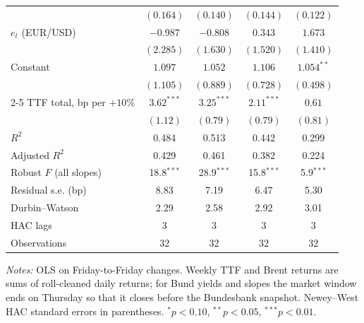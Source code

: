 \documentclass[11pt,a4paper]{article}
\begin{document}
\begin{table}[htbp]
\begin{tabular}{@{}l*{4}{c}@{}}
 & $(0.164)$ & $(0.140)$ & $(0.144)$ & $(0.122)$\\
$e_t$ (EUR/USD) & $-0.987$ & $-0.808$ & $0.343$ & $1.673$\\
 & $(2.285)$ & $(1.630)$ & $(1.520)$ & $(1.410)$\\
Constant & $1.097$ & $1.052$ & $1.106$ & $1.054^{**}$\\
 & $(1.105)$ & $(0.889)$ & $(0.728)$ & $(0.498)$\\
\cmidrule(l){2-5}
TTF total, bp per $+10\%$ & $3.62^{***}$ & $3.25^{***}$ & $2.11^{***}$ & $0.61$\\
 & $(1.12)$ & $(0.79)$ & $(0.79)$ & $(0.81)$\\
$R^2$ & 0.484 & 0.513 & 0.442 & 0.299\\
Adjusted $R^2$ & 0.429 & 0.461 & 0.382 & 0.224\\
Robust $F$ (all slopes) & 18.8$^{***}$ & 28.9$^{***}$ & 15.8$^{***}$ & 5.9$^{***}$\\
Residual s.e. (bp) & 8.83 & 7.19 & 6.47 & 5.30\\
Durbin--Watson & 2.29 & 2.58 & 2.92 & 3.01\\
HAC lags & 3 & 3 & 3 & 3\\
Observations & 32 & 32 & 32 & 32\\
\bottomrule
\end{tabular}
\par\vspace{4pt}\begin{minipage}{0.94\textwidth}\scriptsize\textit{Notes:} OLS on Friday-to-Friday changes. Weekly TTF and Brent returns are sums of roll-cleaned daily returns; for Bund yields and slopes the market window ends on Thursday so that it closes before the Bundesbank snapshot. Newey--West HAC standard errors in parentheses. $^{*}p<0.10$, $^{**}p<0.05$, $^{***}p<0.01$.\end{minipage}
\end{table}
\end{document}
